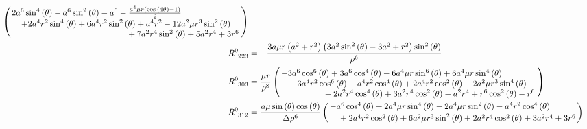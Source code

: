 \documentclass[11pt,a4paper]{article}
\begin{document}
\begin{align}
	\left(\splitfrac{2 a^{6} \sin^{4}{\left(\theta \right)} - a^{6} \sin^{2}{\left(\theta \right)} - a^{6} - \frac{a^{4} \mu r \left(\cos{\left(4 \theta \right)} - 1\right)}{2} }{\splitfrac{+ 2 a^{4} r^{2} \sin^{4}{\left(\theta \right)} + 6 a^{4} r^{2} \sin^{2}{\left(\theta \right)} + a^{4} r^{2} - 12 a^{2} \mu r^{3} \sin^{2}{\left(\theta \right)} }{+ 7 a^{2} r^{4} \sin^{2}{\left(\theta \right)} + 5 a^{2} r^{4} + 3 r^{6}}}\right)\\
	R^0_{\phantom{0} 2 2 3} &=- \frac{3 a \mu r \left(a^{2} + r^{2}\right) \left(3 a^{2} \sin^{2}{\left(\theta \right)} - 3 a^{2} + r^{2}\right) \sin^{2}{\left(\theta \right)}}{\rho^{6}}\\
	R^0_{\phantom{0} 3 0 3} &=\frac{\mu r}{\rho^{8}} 
	\left(\splitfrac{- 3 a^{6} \cos^{6}{\left(\theta \right)} + 3 a^{6} \cos^{4}{\left(\theta \right)} - 6 a^{4} \mu r \sin^{6}{\left(\theta \right)} + 6 a^{4} \mu r \sin^{4}{\left(\theta \right)}}{\splitfrac{ - 3 a^{4} r^{2} \cos^{6}{\left(\theta \right)} + a^{4} r^{2} \cos^{4}{\left(\theta \right)} + 2 a^{4} r^{2} \cos^{2}{\left(\theta \right)} - 2 a^{2} \mu r^{3} \sin^{4}{\left(\theta \right)}}{ - 2 a^{2} r^{4} \cos^{4}{\left(\theta \right)} + 3 a^{2} r^{4} \cos^{2}{\left(\theta \right)} - a^{2} r^{4} + r^{6} \cos^{2}{\left(\theta \right)} - r^{6}}}\right)\\
	R^0_{\phantom{0} 3 1 2} &= \frac{a\mu\sin{\left(\theta\right)} \cos{\left(\theta \right)}}{\Delta \rho^6}
	\left(\splitdfrac{- a^{6} \cos^{4}{\left(\theta \right)} + 2 a^{4} \mu r \sin^{4}{\left(\theta \right)} - 2 a^{4} \mu r \sin^{2}{\left(\theta \right)} - a^{4} r^{2} \cos^{4}{\left(\theta \right)} }{ + 2 a^{4} r^{2} \cos^{2}{\left(\theta \right)}+ 6 a^{2} \mu r^{3} \sin^{2}{\left(\theta \right)} + 2 a^{2} r^{4} \cos^{2}{\left(\theta \right)} + 3 a^{2} r^{4} + 3 r^{6}} \right)\\
\end{align}
\end{document}
